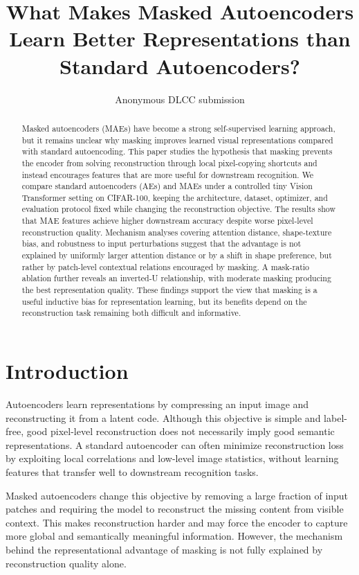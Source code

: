 \documentclass[10pt,twocolumn,letterpaper]{article}
\title{What Makes Masked Autoencoders Learn Better Representations than Standard Autoencoders?}
\author{Anonymous DLCC submission}
\date{}
\begin{document}
\maketitle

\begin{abstract}
Masked autoencoders (MAEs) have become a strong self-supervised learning approach, but it remains unclear why masking improves learned visual representations compared with standard autoencoding. This paper studies the hypothesis that masking prevents the encoder from solving reconstruction through local pixel-copying shortcuts and instead encourages features that are more useful for downstream recognition. We compare standard autoencoders (AEs) and MAEs under a controlled tiny Vision Transformer setting on CIFAR-100, keeping the architecture, dataset, optimizer, and evaluation protocol fixed while changing the reconstruction objective. The results show that MAE features achieve higher downstream accuracy despite worse pixel-level reconstruction quality. Mechanism analyses covering attention distance, shape-texture bias, and robustness to input perturbations suggest that the advantage is not explained by uniformly larger attention distance or by a shift in shape preference, but rather by patch-level contextual relations encouraged by masking. A mask-ratio ablation further reveals an inverted-U relationship, with moderate masking producing the best representation quality. These findings support the view that masking is a useful inductive bias for representation learning, but its benefits depend on the reconstruction task remaining both difficult and informative.
\end{abstract}

\section{Introduction}

Autoencoders learn representations by compressing an input image and reconstructing it from a latent code. Although this objective is simple and label-free, good pixel-level reconstruction does not necessarily imply good semantic representations. A standard autoencoder can often minimize reconstruction loss by exploiting local correlations and low-level image statistics, without learning features that transfer well to downstream recognition tasks.

Masked autoencoders change this objective by removing a large fraction of input patches and requiring the model to reconstruct the missing content from visible context. This makes reconstruction harder and may force the encoder to capture more global and semantically meaningful information. However, the mechanism behind the representational advantage of masking is not fully explained by reconstruction quality alone.
\end{document}
